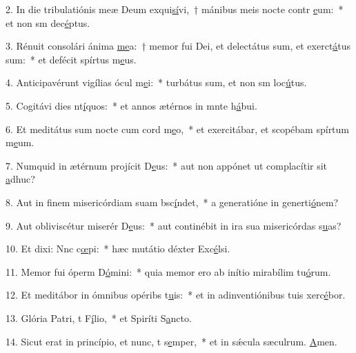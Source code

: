 2. In die tribulatiónis meæ Deum exqui\uline{sí}vi,~† mánibus meis nocte contr \uline{e}um:~* et non sm dec\uline{é}ptus.\par 
3. Rénuit consolári ánima \uline{me}a:~† memor fui Dei, et delectátus sum, et exerct\uline{á}tus sum:~* et defécit spírtus m\uline{e}us.\par 
4. Anticipavérunt vigílias ócul m\uline{e}i:~* turbátus sum, et non sm loc\uline{ú}tus.\par 
5. Cogitávi dies nt\uline{í}quos:~* et annos ætérnos in mnte h\uline{á}bui.\par 
6. Et meditátus sum nocte cum cord m\uline{e}o,~* et exercitábar, et scopébam spírtum m\uline{e}um.\par 
7. Numquid in ætérnum projícit D\uline{e}us:~* aut non appónet ut complacítir sit \uline{a}dhuc?\par 
8. Aut in finem misericórdiam suam bsc\uline{í}ndet,~* a generatióne in generti\uline{ó}nem?\par 
9. Aut obliviscétur miserér D\uline{e}us:~* aut continébit in ira sua misericórdas s\uline{u}as?\par 
10. Et dixi: Nnc c\uline{œ}pi:~* hæc mutátio déxter Exc\uline{é}lsi.\par 
11. Memor fui óperm D\uline{ó}mini:~* quia memor ero ab inítio mirabílim tu\uline{ó}rum.\par 
12. Et meditábor in ómnibus opéribs t\uline{u}is:~* et in adinventiónibus tuis xerc\uline{é}bor.\par 
13. Glória Patri, t F\uline{í}lio,~* et Spiríti S\uline{a}ncto.\par 
14. Sicut erat in princípio, et nunc, t s\uline{e}mper,~* et in sǽcula sæculrum. \uline{A}men.\par 
